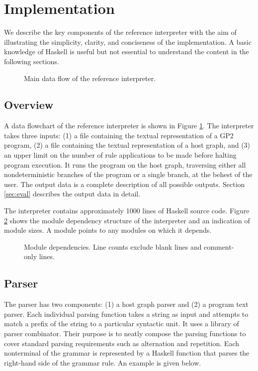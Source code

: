\section{Implementation}
\label{sec:implementation}
We describe the key components of the reference interpreter with the aim of illustrating the simplicity, clarity, and conciseness of the implementation. A basic knowledge of Haskell is useful but not essential to understand the content in the following sections. 

\begin{figure}
\centering

\caption{Main data flow of the reference interpreter.} \label{fig:architecture}
\end{figure}

\subsection{Overview}
A data flowchart of the reference interpreter is shown in Figure \ref{fig:architecture}. The interpreter takes three inputs: (1) a file containing the textual representation of a GP2 program, (2) a file containing the textual representation of a host graph, and (3) an upper limit on the number of rule applications to be made before halting program execution. It runs the program on the host graph, traversing either all nondeterministic branches of the program or a single branch, at the behest of the user. The output data is a complete description of all possible outputs. Section \ref{sec:eval} describes the output data in detail.

The interpreter contains approximately 1000 lines of Haskell source code. Figure \ref{fig:modules} shows the module dependency structure of the interpreter and an indication of module sizes. A module points to any modules on which it depends. 

\begin{figure}
\centering

\caption{Module dependencies. Line counts exclude blank lines and comment-only lines.} \label{fig:modules}
\end{figure}

\subsection{Parser}
The parser has two components: (1) a host graph parser and (2) a program text parser. Each individual parsing function takes a string as input and attempts to match a prefix of the string to a particular syntactic unit. It uses a library of parser combinator. Their purpose is to neatly compose the parsing functions to cover standard parsing requirements such as alternation and repetition. Each nonterminal of the grammar is represented by a Haskell function that parses the right-hand side of the grammar rule. An example is given below.

